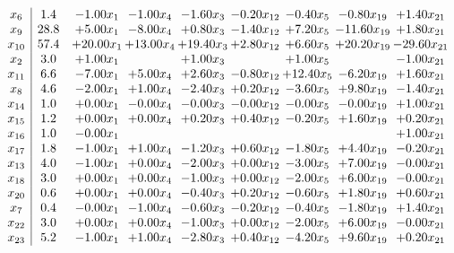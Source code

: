 \documentclass[8pt]{article}
\begin{document}
\[\begin{array}{c| c c@{\hskip 2pt} c@{\hskip 2pt} c@{\hskip 2pt} c@{\hskip 2pt} c@{\hskip 2pt} c@{\hskip 2pt} c@{\hskip 2pt} }
 x_{6}   &  1.4 & -1.00 x_{1} & -1.00 x_{4} & -1.60 x_{3} & -0.20 x_{12} & -0.40 x_{5} & -0.80 x_{19} & +  1.40 x_{21}\\
 x_{9}   &  28.8 & +  5.00 x_{1} & -8.00 x_{4} & +  0.80 x_{3} & -1.40 x_{12} & +  7.20 x_{5} & -11.60 x_{19} & +  1.80 x_{21}\\
 x_{10}   &  57.4 & + 20.00 x_{1} & + 13.00 x_{4} & + 19.40 x_{3} & +  2.80 x_{12} & +  6.60 x_{5} & + 20.20 x_{19} & -29.60 x_{21}\\
 x_{2}   &  3.0 & +  1.00 x_{1} &   & +  1.00 x_{3} &   & +  1.00 x_{5} &   & -1.00 x_{21}\\
 x_{11}   &  6.6 & -7.00 x_{1} & +  5.00 x_{4} & +  2.60 x_{3} & -0.80 x_{12} & + 12.40 x_{5} & -6.20 x_{19} & +  1.60 x_{21}\\
 x_{8}   &  4.6 & -2.00 x_{1} & +  1.00 x_{4} & -2.40 x_{3} & +  0.20 x_{12} & -3.60 x_{5} & +  9.80 x_{19} & -1.40 x_{21}\\
 x_{14}   &  1.0 & +  0.00 x_{1} & -0.00 x_{4} & -0.00 x_{3} & -0.00 x_{12} & -0.00 x_{5} & -0.00 x_{19} & +  1.00 x_{21}\\
 x_{15}   &  1.2 & +  0.00 x_{1} & +  0.00 x_{4} & +  0.20 x_{3} & +  0.40 x_{12} & -0.20 x_{5} & +  1.60 x_{19} & +  0.20 x_{21}\\
 x_{16}   &  1.0 & -0.00 x_{1} &    &    &    &    &   & +  1.00 x_{21}\\
 x_{17}   &  1.8 & -1.00 x_{1} & +  1.00 x_{4} & -1.20 x_{3} & +  0.60 x_{12} & -1.80 x_{5} & +  4.40 x_{19} & -0.20 x_{21}\\
 x_{13}   &  4.0 & -1.00 x_{1} & +  0.00 x_{4} & -2.00 x_{3} & +  0.00 x_{12} & -3.00 x_{5} & +  7.00 x_{19} & -0.00 x_{21}\\
 x_{18}   &  3.0 & +  0.00 x_{1} & +  0.00 x_{4} & -1.00 x_{3} & +  0.00 x_{12} & -2.00 x_{5} & +  6.00 x_{19} & -0.00 x_{21}\\
 x_{20}   &  0.6 & +  0.00 x_{1} & +  0.00 x_{4} & -0.40 x_{3} & +  0.20 x_{12} & -0.60 x_{5} & +  1.80 x_{19} & +  0.60 x_{21}\\
 x_{7}   &  0.4 & -0.00 x_{1} & -1.00 x_{4} & -0.60 x_{3} & -0.20 x_{12} & -0.40 x_{5} & -1.80 x_{19} & +  1.40 x_{21}\\
 x_{22}   &  3.0 & +  0.00 x_{1} & +  0.00 x_{4} & -1.00 x_{3} & +  0.00 x_{12} & -2.00 x_{5} & +  6.00 x_{19} & -0.00 x_{21}\\
 x_{23}   &  5.2 & -1.00 x_{1} & +  1.00 x_{4} & -2.80 x_{3} & +  0.40 x_{12} & -4.20 x_{5} & +  9.60 x_{19} & +  0.20 x_{21}\\

\end{array}\]
\end{document}
